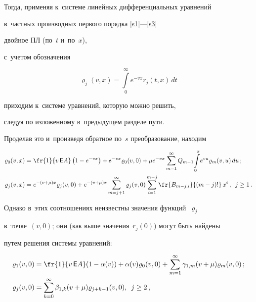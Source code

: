 Тогда, применяя к~сис\-те\-ме линейных дифференциальных уравнений

в~част\-ных производных первого порядка \eqref{s1}---\eqref{s3}

двойное ПЛ (по~$t$ и~по~$x$),

с~учетом обозначения

$$

\varrho_j(v,x)=\int\limits_0^\infty  e^{-v x}r_j(t,x) \, dt

$$

приходим к~сис\-те\-ме уравнений, которую можно решить,

следуя по изложенному в~предыду\-щем разделе пути.

Проделав это и~произведя обратное по~$s$ преобразование, находим

\begin{align*}

\varrho_0(v,x)&=

\fr{1}{v\,\mathsf{E}A}

\left(1-e^{- v x}\right) + e^{-vx} \varrho_0(v,0)

+\mu e^{- v x} \sum\limits_{m=1}^\infty

Q_{m-1}\! \int\limits_0^x\! e^{vu} \varrho_m(v,u)\,du\,;

\\

\varrho_j(v,x)&=

e^{-(v+\mu) x} \varrho_j(v,0)

+e^{-(v+\mu) x} \sum\limits_{m=j+1}^\infty

\varrho_j(v,0)

\sum\limits_{i=1}^{m-j}

\fr{B_{m-j,i}}{(m-j)!}\,  x^i\,, \enskip j \ge 1\,.

\end{align*}

Однако в~этих соотношениях неизвестны значения функций~$\varrho_j$

в~точке~$(v,0)$; они (как выше значения~$r_j(0)$) могут быть найдены

путем решения сис\-те\-мы уравнений:

\begin{align*}

\varrho_1(v,0)&=

\fr{1}{v \,\mathsf{E}A}

(1-\alpha(v))+\alpha(v)\varrho_0(v,0)+

\sum\limits_{m=1}^\infty \gamma_{1,m}(v+\mu)

\varrho_m(v,0)\,;

\\

\varrho_j(v,0)&

=\sum\limits_{k=0}^{\infty}

\beta_{1,k}(v+\mu)

\varrho_{j+k-1}(v,0), \enskip  j \ge 2\,,

\end{align*}

